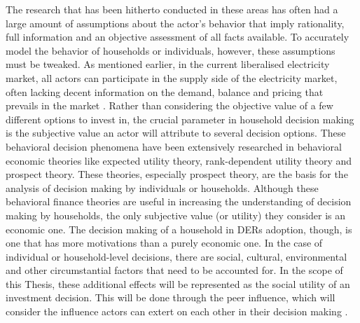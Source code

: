 \newline \newline \noindent
The research that has been hitherto conducted in these areas has often had a large amount of assumptions about the actor's behavior that imply rationality, full information and an objective assessment of all facts available. To accurately model the behavior of households or individuals, however, these assumptions must be tweaked. As mentioned earlier, in the current liberalised electricity market, all actors can participate in the supply side of the electricity market, often lacking decent information on the demand, balance and pricing that prevails in the market \cite{EnergyMarket}. Rather than considering the objective value of a few different options to invest in, the crucial parameter in household decision making is the subjective value an actor will attribute to several decision options. These behavioral decision phenomena have been extensively researched in behavioral economic theories like expected utility theory, rank-dependent utility theory and prospect theory. These theories, especially prospect theory, are the basis for the analysis of decision making by individuals or households.  
\newline \newline \noindent
Although these behavioral finance theories are useful in increasing the understanding of decision making by households, the only subjective value (or utility) they consider is an economic one. The decision making of a household in DERs adoption, though, is one that has more motivations than a purely economic one. In the case of individual or household-level decisions, there are social, cultural, environmental and other circumstantial factors that need to be accounted for. In the scope of this Thesis, these additional effects will be represented as the social utility of an investment decision. This will be done through the peer influence, which will consider the influence actors can extert on each other in their decision making \cite{peer}. 
